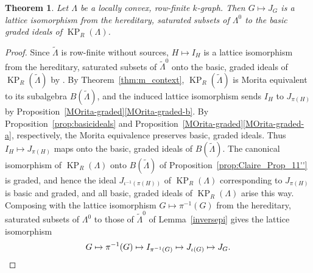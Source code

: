 \documentclass[a4paper,12pt]{amsart}
\numberwithin{equation}{section}
\newtheorem{thm}{Theorem}[section]
\theoremstyle{definition}
\theoremstyle{remark}
\begin{document}
\begin{thm}\label{thm-ideals}
Let $\Lambda$ be a locally convex, row-finite $k$-graph. Then $G\mapsto J_G$ is a lattice isomorphism from the hereditary, saturated subsets of $\Lambda^0$ to the basic graded ideals of $\operatorname{KP}_R(\Lambda)$.
\end{thm}
\begin{proof}
 Since $\tilde\Lambda$ is row-finite without sources, $H\mapsto I_H$ is a lattice isomorphism from the hereditary, saturated subsets of ${\tilde{\Lambda}}^0$ onto the basic, graded ideals of $\operatorname{KP}_R({\tilde{\Lambda}})$ by \cite[Theorem~5.1]{ACaHR}.   By Theorem~\ref{thm:m_context}, $\operatorname{KP}_R({\tilde{\Lambda}})$ is Morita equivalent to its subalgebra $B(\tilde\Lambda)$, and the induced lattice isomorphism  sends $I_H$ to $J_{\pi(H)}$ by Proposition~\ref{MOrita-graded}\eqref{MOrita-graded-b}.  By  Proposition~\ref{prop:basicideals} and Proposition~\ref{MOrita-graded}\eqref{MOrita-graded-a}, respectively, the Morita equivalence preserves basic, graded ideals.  Thus $I_H\mapsto J_{\pi(H)}$  maps onto the basic, graded ideals of $B(\tilde\Lambda)$.
 The canonical isomorphism of $\operatorname{KP}_R(\Lambda)$ onto $B(\tilde\Lambda)$ of Proposition~\ref{prop:Claire_Prop_11''} is graded, and hence the ideal $J_{\iota^{-1}(\pi(H))}$ of  $\operatorname{KP}_R(\Lambda)$ corresponding to $J_{\pi(H)}$ is basic and graded, and all basic, graded ideals of $\operatorname{KP}_R(\Lambda)$ arise this way.
 Composing with the lattice isomorphism $G\mapsto \pi^{-1}(G)$ from the hereditary, saturated subsets of $\Lambda^0$  to those of ${\tilde{\Lambda}}^0$ of Lemma~\ref{inversepi} gives the lattice isomorphism 
 \[
 G\mapsto \pi^{-1}(G)\mapsto I_{\pi^{-1}(G)}\mapsto J_{\iota(G)}\mapsto J_G.\qedhere
 \]
\end{proof}
\end{document}
